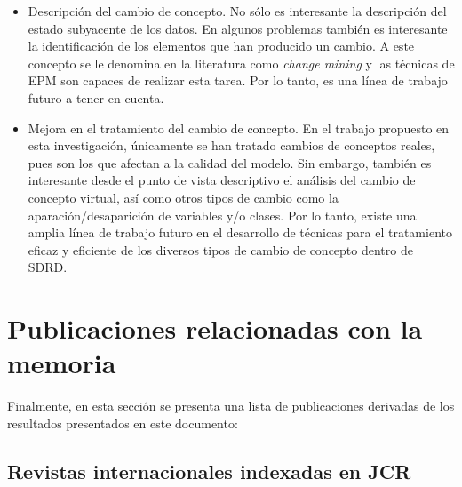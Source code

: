 \documentclass[c5paper,10pt,twoside]{book}	   	%
\begin{document}
\begin{itemize}
	\item Descripción del cambio de concepto. No sólo es interesante la descripción del estado subyacente de los datos. En algunos problemas también es interesante la identificación de los elementos que han producido un cambio. A este concepto se le denomina en la literatura como \textit{change mining} \cite{Boe11} y las técnicas de \ac{EPM} son capaces de realizar esta tarea. Por lo tanto, es una línea de trabajo futuro a tener en cuenta.
	
	\item Mejora en el tratamiento del cambio de concepto. En el trabajo propuesto en esta investigación, únicamente se han tratado cambios de conceptos reales, pues son los que afectan a la calidad del modelo. Sin embargo, también es interesante desde el punto de vista descriptivo el análisis del cambio de concepto virtual, así como otros tipos de cambio como la aparación/desaparición de variables y/o clases. Por lo tanto, existe una amplia línea de trabajo futuro en el desarrollo de técnicas para el tratamiento eficaz y eficiente de los diversos tipos de cambio de concepto dentro de \ac{SDRD}.
	

	
\end{itemize}

\section{Publicaciones relacionadas con la memoria} \label{sec:relacionadas}

Finalmente, en esta sección se presenta una lista de publicaciones derivadas de los resultados presentados en este documento:

\subsection{Revistas internacionales indexadas en JCR}
	
\end{document}
